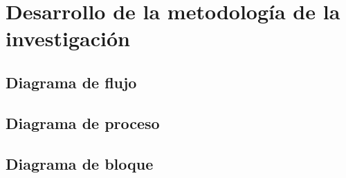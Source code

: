 \chapter{Desarrollo de la metodología de la investigación}
\section{Diagrama de flujo}
\section{Diagrama de proceso}
\section{Diagrama de bloque}